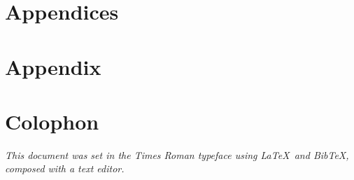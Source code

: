 
\chapter{Appendices}
\appendix
\chapter{Appendix} \label{appendixlabel1}
    \blindtext
    
\chapter{Colophon} \label{appendixlabel3}
    \textit{This document was set in the Times Roman typeface using \LaTeX\ and Bib\TeX , composed with a text editor.}
